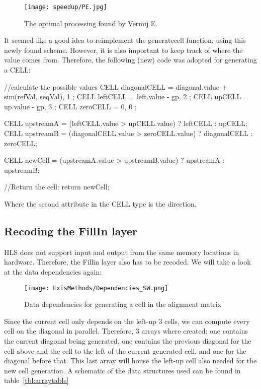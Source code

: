 \begin{figure}[H]
	\centering
	\texttt{[image: speedup/PE.jpg]}
	\caption{The optimal processing found by Vermij E.~\cite{Vermij}}
	\label{fig:PE}
\end{figure}

It seemed like a good idea to reimplement the generatecell function, using this newly found scheme. However, it is also important to keep track of where the value comes from. Therefore, the following (new) code was adopted for generating a CELL:

\begin{lcverbatim}
//calculate the possible  values
CELL diagonalCELL = { diagonal.value + sim(refVal, seqVal), 1 };
CELL leftCELL = { left.value - gp, 2 };
CELL upCELL = { up.value - gp, 3 };
CELL zeroCELL = { 0, 0 };

CELL upstreamA = (leftCELL.value > upCELL.value) ? leftCELL : upCELL;
CELL upstreamB = (diagonalCELL.value > zeroCELL.value) ? 
diagonalCELL : zeroCELL;

CELL newCell = (upstreamA.value > upstreamB.value) ? upstreamA : upstreamB;

//Return the cell:
return newCell;
\end{lcverbatim}
Where the second attribute in the CELL type is the direction.

\subsection{Recoding the FillIn layer}

HLS does not support input and output from the same memory locations in hardware. Therefore, the Fillin layer also has to be recoded. We will take a look at the data dependencies again:

\begin{figure}[H]
	\centering
	\texttt{[image: ExisMethods/Dependencies\_SW.png]}
	\caption{Data dependencies for generating a cell in the alignment matrix}
	\label{fig:DatDep2}
\end{figure}

Since the current cell only depends on the left-up 3 cells, we can compute every cell on the diagonal in parallel. Therefore, 3 arrays where created: one contains the current diagonal being generated, one contains the previous diagonal for the cell above and the cell to the left of the current generated cell, and one for the diagonal before that. This last array will house the left-up cell also needed for the new cell generation. A schematic of the data structures used can be found in table~\ref{tbl:arraytable}

